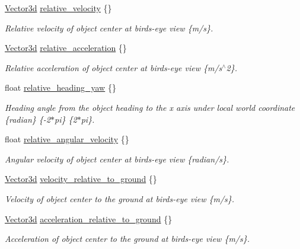 \begin{DoxyCompactItemize}
\hyperlink{structmaf__perception__interface_1_1Vector3d}{Vector3d} \hyperlink{structmaf__perception__interface_1_1PerceptionFusionAEBObjectData_abd8f9c92aaeedd0a17f72625690aeecd}{relative\+\_\+velocity} \{\}
\begin{DoxyCompactList}\small\item\em Relative velocity of object center at bird\textquotesingle{}s-\/eye view \{m/s\}. \end{DoxyCompactList}\item 
\hyperlink{structmaf__perception__interface_1_1Vector3d}{Vector3d} \hyperlink{structmaf__perception__interface_1_1PerceptionFusionAEBObjectData_a22c9420d05aedd26ceed9f82a69c8c3a}{relative\+\_\+acceleration} \{\}
\begin{DoxyCompactList}\small\item\em Relative acceleration of object center at bird\textquotesingle{}s-\/eye view \{m/s$^\wedge$2\}. \end{DoxyCompactList}\item 
float \hyperlink{structmaf__perception__interface_1_1PerceptionFusionAEBObjectData_a574dcc89a92665a41b7ff330a9cdd645}{relative\+\_\+heading\+\_\+yaw} \{\}
\begin{DoxyCompactList}\small\item\em Heading angle from the object heading to the x axis under local world coordinate \{radian\} \{-\/2$\ast$pi\} \{2$\ast$pi\}. \end{DoxyCompactList}\item 
float \hyperlink{structmaf__perception__interface_1_1PerceptionFusionAEBObjectData_afc8e2d918d03d09420e70422d314c8f5}{relative\+\_\+angular\+\_\+velocity} \{\}
\begin{DoxyCompactList}\small\item\em Angular velocity of object center at bird\textquotesingle{}s-\/eye view \{radian/s\}. \end{DoxyCompactList}\item 
\hyperlink{structmaf__perception__interface_1_1Vector3d}{Vector3d} \hyperlink{structmaf__perception__interface_1_1PerceptionFusionAEBObjectData_a6e3d044f87c811b5d7b1a7d0c6fbd33f}{velocity\+\_\+relative\+\_\+to\+\_\+ground} \{\}
\begin{DoxyCompactList}\small\item\em Velocity of object center to the ground at bird\textquotesingle{}s-\/eye view \{m/s\}. \end{DoxyCompactList}\item 
\hyperlink{structmaf__perception__interface_1_1Vector3d}{Vector3d} \hyperlink{structmaf__perception__interface_1_1PerceptionFusionAEBObjectData_abddbe98fc88ebc7c512ff2ab3be6c20d}{acceleration\+\_\+relative\+\_\+to\+\_\+ground} \{\}
\begin{DoxyCompactList}\small\item\em Acceleration of object center to the ground at bird\textquotesingle{}s-\/eye view \{m/s\}. \end{DoxyCompactList}\end{DoxyCompactItemize}



